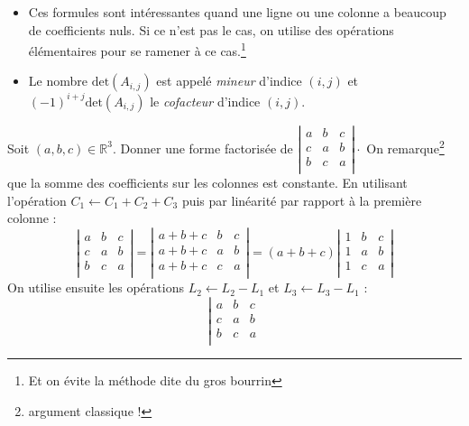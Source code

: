 \documentclass[french,11pt,twoside]{VcCours}
\begin{document}
\begin{Remarques}{}
\begin{itemize} 
\item Ces formules sont intéressantes quand une ligne ou une colonne a beaucoup de coefficients nuls. Si ce n'est pas le cas, on utilise des opérations élémentaires pour se ramener à ce cas.\footnote{Et on évite la méthode dite \og du gros bourrin \fg }
\item Le nombre $\textrm{det}(A_{i,j})$ est appelé \emph{mineur} d'indice $(i,j)$ et $(-1)^{i+j}\textrm{det}(A_{i,j})$ le \emph{cofacteur} d'indice $(i,j)$.
\end{itemize}
\end{Remarques}{}


\begin{Exemple} Soit $(a,b,c) \in \mathbb{R}^3$. Donner une forme factorisée de $\left\vert \begin{array}{ccc}
a & b & c \\
c & a & b \\
b & c & a \\
\end{array} \right\vert \cdot$
%
%
On remarque\footnote{argument classique !} que la somme des coefficients sur les colonnes est constante. En utilisant l'opération $C_1 \leftarrow C_1+C_2+C_3$ puis par linéarité par rapport à la première colonne :
$$ \left\vert \begin{array}{ccc}
a & b & c \\
c & a & b \\
b & c & a \\
\end{array} \right\vert = \left\vert \begin{array}{ccc}
a+b+c & b & c \\
a+b+c & a & b \\
a+b+c & c & a \\
\end{array} \right\vert = (a+b+c) \left\vert \begin{array}{ccc}
1 & b & c \\
1 & a & b \\
1 & c & a \\
\end{array} \right\vert$$
On utilise ensuite les opérations $L_2 \leftarrow L_2-L_1$ et $L_3 \leftarrow L_3 - L_1$ :
$$  \left\vert \begin{array}{ccc}
a & b & c \\
c & a & b \\
b & c & a \\

\end{array}$$
\end{Exemple}
\end{document}

